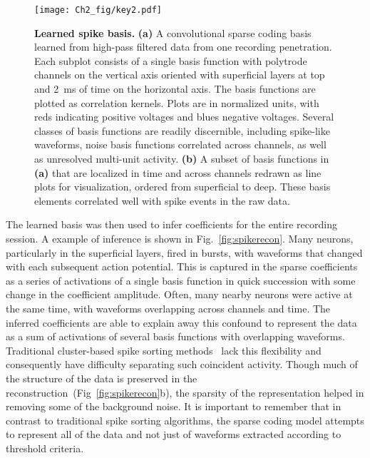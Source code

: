 \begin{figure}[htp!]
  \centering
  \texttt{[image: Ch2\_fig/key2.pdf]}
  \caption{\textbf{Learned spike basis.} \textbf{(a)} A convolutional
    sparse coding basis learned from high-pass filtered data from one
    recording penetration. Each subplot consists of a single basis
    function with polytrode channels on the vertical axis oriented
    with superficial layers at top and 2~ms of time on the horizontal
    axis. The basis functions are plotted as correlation
    kernels. Plots are in normalized units, with reds indicating
    positive voltages and blues negative voltages. Several classes of
    basis functions are readily discernible, including spike-like
    waveforms, noise basis functions correlated across channels, as
    well as unresolved multi-unit activity.  \textbf{(b)} A subset of
    basis functions in \textbf{(a)} that are localized in time and
    across channels redrawn as line plots for visualization, ordered
    from superficial to deep. These basis elements correlated well
    with spike events in the raw data.}
  \label{fig:spikebasis}
\end{figure}
\afterpage{\clearpage}

The learned basis was then used to infer coefficients for the entire
recording session. A example of inference is shown in
Fig.~\ref{fig:spikerecon}. Many neurons, particularly in the
superficial layers, fired in bursts, with waveforms that changed with
each subsequent action potential. This is captured in the sparse
coefficients as a series of activations of a single basis function in
quick succession with some change in the coefficient amplitude. Often,
many nearby neurons were active at the same time, with waveforms
overlapping across channels and time. The inferred coefficients are
able to explain away this confound to represent the data as a sum of
activations of several basis functions with overlapping
waveforms. Traditional cluster-based spike sorting
methods~\cite{Lewicki:1998ve} lack this flexibility and consequently
have difficulty separating such coincident activity. Though much of
the structure of the data is preserved in the
reconstruction~(Fig~\ref{fig:spikerecon}b), the sparsity of the
representation helped in removing some of the background noise. It is
important to remember that in contrast to traditional spike sorting
algorithms, the sparse coding model attempts to represent all of the
data and not just of waveforms extracted according to threshold
criteria.

